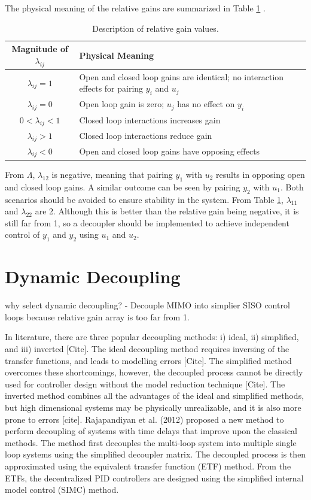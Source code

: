 The physical meaning of the relative gains are summarized in Table \ref{tab: relative_gains} \cite{process_control_design_sim}.
\begin{table}[h]
    \centering
    {
    \begin{tabular}{ c | p{12cm} }
        Magnitude of $\lambda_{ij}$  & Physical Meaning \\
        \hline
        $\lambda_{ij} = 1$ & Open and closed loop gains are identical; no interaction effects for pairing $y_i$ and $u_j$ \\
        $\lambda_{ij} = 0$ & Open loop gain is zero; $u_j$ has no effect on $y_i$ \\
        $ 0 < \lambda_{ij} < 1$ & Closed loop interactions increases gain \\
        $\lambda_{ij} > 1$ &  Closed loop interactions reduce gain \\
        $\lambda_{ij} < 0$ & Open and closed loop gains have opposing effects \\
    \end{tabular}}
    \caption{Description of relative gain values.}
    \label{tab: relative_gains}
\end{table}

From $\Lambda$, $\lambda_{12}$ is negative, meaning that pairing $y_1$ with $u_2$ results in opposing open and closed loop gains.  A similar outcome can be seen by pairing $y_2$ with $u_1$.  Both scenarios should be avoided to ensure stability in the system. From Table \ref{tab: relative_gains}, $\lambda_{11}$ and $\lambda_{22}$ are 2.  Although this is better than the relative gain being negative, it is still far from 1, so a decoupler should be implemented to achieve independent control of $y_1$ and $y_2$ using $u_1$ and $u_2$.

\section{Dynamic Decoupling}
why select dynamic decoupling?
- Decouple MIMO into simplier SISO control loops because relative gain array is too far from 1.

In literature, there are three popular decoupling methods: i) ideal, ii) simplified, and iii) inverted [Cite].  The ideal decoupling method requires inversing of the transfer functions, and leads to modelling errors [Cite].  The simplified method overcomes these shortcomings, however, the decoupled process cannot be directly used for controller design without the model reduction technique [Cite].  The inverted method combines all the advantages of the ideal and simplified methods, but high dimensional systems may be physically unrealizable, and it is also more prone to errors [cite].  Rajapandiyan et al. (2012) proposed a new method to perform decoupling of systems with time delays that improve upon the classical methods.  The method first decouples the multi-loop system into multiple single loop systems using the simplified decoupler matrix.  The decoupled process is then approximated using the equivalent transfer function (ETF) method.  From the ETFs, the decentralized PID controllers are designed using the simplified internal model control (SIMC) method. 

